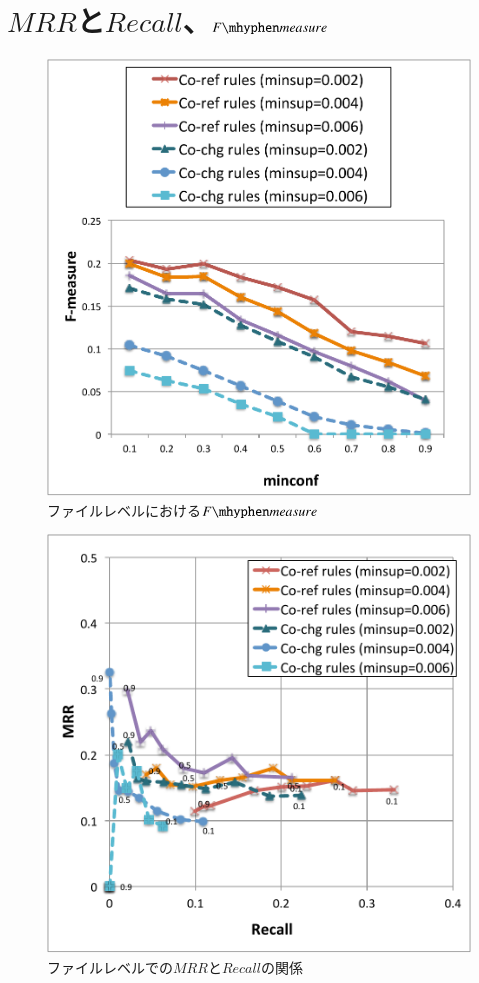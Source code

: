 \documentclass[a4paper]{jsbook}
\newcommand{\fmeasure}{F\mhyphen measure}
\begin{document}
\section{$MRR$と$Recall$、$\fmeasure$}\label{mainresult_sec}
\begin{figure}[p]
  \centering
  \includegraphics[width = 0.95\linewidth]{resource/fmeasure_f.pdf}
  \caption{ファイルレベルにおける$\fmeasure$}
  \label{f_fmeasure}
\end{figure}
\begin{figure}[p]
  \centering
  \includegraphics[width = 0.95\linewidth]{resource/mrgraph_f.pdf}
  \caption{ファイルレベルでの$MRR$と$Recall$の関係}
  \label{f_mrgraph}
\end{figure}
\end{document}

